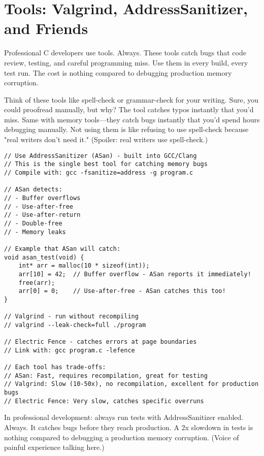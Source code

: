\section{Tools: Valgrind, AddressSanitizer, and Friends}

Professional C developers use tools. Always. These tools catch bugs that code review, testing, and careful programming miss. Use them in every build, every test run. The cost is nothing compared to debugging production memory corruption.

Think of these tools like spell-check or grammar-check for your writing. Sure, you could proofread manually, but why? The tool catches typos instantly that you'd miss. Same with memory tools—they catch bugs instantly that you'd spend hours debugging manually. Not using them is like refusing to use spell-check because "real writers don't need it." (Spoiler: real writers use spell-check.)

\begin{lstlisting}
// Use AddressSanitizer (ASan) - built into GCC/Clang
// This is the single best tool for catching memory bugs
// Compile with: gcc -fsanitize=address -g program.c

// ASan detects:
// - Buffer overflows
// - Use-after-free
// - Use-after-return
// - Double-free
// - Memory leaks

// Example that ASan will catch:
void asan_test(void) {
    int* arr = malloc(10 * sizeof(int));
    arr[10] = 42;  // Buffer overflow - ASan reports it immediately!
    free(arr);
    arr[0] = 0;    // Use-after-free - ASan catches this too!
}

// Valgrind - run without recompiling
// valgrind --leak-check=full ./program

// Electric Fence - catches errors at page boundaries
// Link with: gcc program.c -lefence

// Each tool has trade-offs:
// ASan: Fast, requires recompilation, great for testing
// Valgrind: Slow (10-50x), no recompilation, excellent for production bugs
// Electric Fence: Very slow, catches specific overruns
\end{lstlisting}

\begin{notebox}
In professional development: always run tests with AddressSanitizer enabled. Always. It catches bugs before they reach production. A 2x slowdown in tests is nothing compared to debugging a production memory corruption. (Voice of painful experience talking here.)
\end{notebox}

